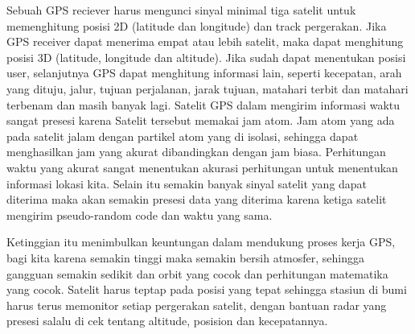 Sebuah GPS reciever harus mengunci sinyal minimal tiga satelit untuk memenghitung posisi 2D (latitude dan longitude) dan track pergerakan. Jika GPS receiver dapat menerima empat atau lebih satelit, maka dapat menghitung posisi 3D (latitude, longitude dan altitude). Jika sudah dapat menentukan posisi user, selanjutnya GPS dapat menghitung informasi lain, seperti kecepatan, arah yang dituju, jalur, tujuan perjalanan, jarak tujuan, matahari terbit dan matahari terbenam dan masih banyak lagi. 
Satelit GPS dalam mengirim informasi waktu sangat presesi karena Satelit tersebut memakai jam atom. Jam atom yang ada pada satelit jalam dengan partikel atom yang di isolasi, sehingga dapat menghasilkan jam yang akurat dibandingkan dengan jam biasa.
Perhitungan waktu yang akurat sangat menentukan akurasi perhitungan untuk menentukan informasi lokasi kita. Selain itu semakin banyak sinyal satelit yang dapat diterima maka akan semakin presesi data yang diterima karena ketiga satelit mengirim pseudo-random code dan waktu yang sama.

Ketinggian itu menimbulkan keuntungan dalam mendukung proses kerja GPS, bagi kita karena semakin tinggi maka semakin bersih atmosfer, sehingga gangguan semakin sedikit dan orbit yang cocok dan perhitungan matematika yang cocok. Satelit harus teptap pada posisi yang tepat sehingga stasiun di bumi harus terus memonitor setiap pergerakan satelit, dengan bantuan radar yang presesi salalu di cek tentang altitude, posision dan kecepatannya.

